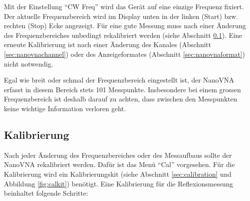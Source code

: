 \documentclass[twoside,a4paper,11pt,halfparskip,DIV=11,notitlepage]{scrartcl}
\begin{document}
Mit der Einstellung ``CW Freq'' wird das Gerät auf eine einzige Frequenz fixiert.
Der aktuelle Frequenzbereich wird im Display unten in der linken (Start) bzw.
rechten (Stop) Ecke angezeigt.
Für eine gute Messung muss nach einer Änderung des Frequenzbereiches unbedingt
rekalibriert werden (siehe Abschnitt \ref{sec:nanovnacal}). Eine erneute Kalibrierung
ist nach einer Änderung des Kanales (Abschnitt \ref{sec:nanovnachannel}) oder
des Anzeigeformates (Abschnitt \ref{sec:nanovnaformat}) nicht notwendig.

Egal wie breit oder schmal der Frequenzbereich eingestellt ist, der NanoVNA erfasst in diesem Bereich stets
101 Messpunkte. Insbesondere bei einem grossen Frequenzbereich ist deshalb darauf zu achten, dass zwischen
den Messpunkten keine wichtige Information verloren geht.

\subsection{Kalibrierung}\label{sec:nanovnacal}
\begin{center}\end{center}

Nach jeder Änderung des Frequenzbereiches oder des Messaufbaus sollte der
NanoVNA rekalibriert werden. Dafür ist das Menü ``Cal'' vorgesehen. Für die
Kalibrierung wird ein Kalibrierungskit (siehe Abschnitt \ref{sec:calibration}
und Abbildung \ref{fig:calkit}) benötigt. Eine Kalibrierung für die
Reflexionsmessung beinhaltet folgende Schritte:
\end{document}
